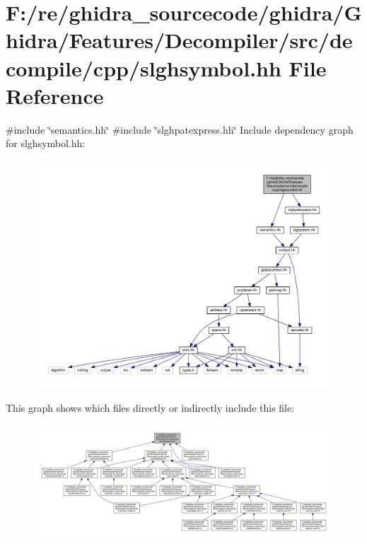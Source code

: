 \hypertarget{slghsymbol_8hh}{}\section{F\+:/re/ghidra\+\_\+sourcecode/ghidra/\+Ghidra/\+Features/\+Decompiler/src/decompile/cpp/slghsymbol.hh File Reference}
\label{slghsymbol_8hh}
{\ttfamily \#include \char`\"{}semantics.\+hh\char`\"{}}\newline
{\ttfamily \#include \char`\"{}slghpatexpress.\+hh\char`\"{}}\newline
Include dependency graph for slghsymbol.\+hh\+:
\nopagebreak
\begin{figure}[H]
\begin{center}
\leavevmode
\includegraphics[width=350pt]{slghsymbol_8hh__incl}
\end{center}
\end{figure}
This graph shows which files directly or indirectly include this file\+:
\nopagebreak
\begin{figure}[H]
\begin{center}
\leavevmode
\includegraphics[width=350pt]{slghsymbol_8hh__dep__incl}
\end{center}
\end{figure}
